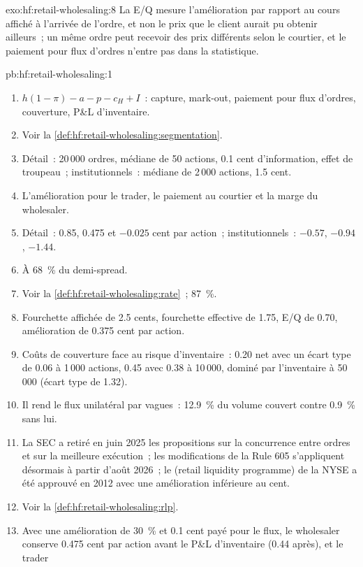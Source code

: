 \begin{solution}{exo:hf:retail-wholesaling:8}
La E/Q mesure l'amélioration par rapport au cours affiché à l'arrivée de l'ordre, et non le prix que le client aurait pu obtenir ailleurs~; un même ordre peut recevoir des
prix différents selon le courtier, et le paiement pour flux d'ordres n'entre pas dans la statistique.
\end{solution}

\begin{solution}{pb:hf:retail-wholesaling:1}
\begin{enumerate}
\item $h(1-\pi)-a-p-c_H+I$~: capture, mark-out, paiement pour flux d'ordres, couverture, P\&L d'inventaire.
\item Voir la \cref{def:hf:retail-wholesaling:segmentation}.
\item Détail~: 20\,000 ordres, médiane de 50 actions, 0.1 cent d'information, effet de troupeau~; institutionnels~: médiane de 2\,000 actions, 1.5 cent.
\item L'amélioration pour le trader, le paiement au courtier et la marge du wholesaler.
\item Détail~: 0.85, 0.475 et $-0.025$ cent par action~; institutionnels~: $-0.57$, $-0.94$, $-1.44$.
\item À 68~\% du demi-spread.
\item Voir la \cref{def:hf:retail-wholesaling:rate}~; 87~\%.
\item Fourchette affichée de 2.5 cents, fourchette effective de 1.75, E/Q de 0.70, amélioration de 0.375 cent par action.
\item Coûts de couverture face au risque d'inventaire~: 0.20 net avec un écart type de 0.06 à 1\,000 actions, 0.45 avec 0.38 à 10\,000, dominé par l'inventaire à 50\,000
(écart type de 1.32).
\item Il rend le flux unilatéral par vagues~: 12.9~\% du volume couvert contre 0.9~\% sans lui.
\item La SEC a retiré en juin 2025 les propositions sur la concurrence entre ordres et sur la meilleure exécution~; les modifications de la Rule 605 s'appliquent désormais à partir d'août 2026~; le
 (retail liquidity programme) de la NYSE a été approuvé en 2012 avec une amélioration inférieure au cent.
\item Voir la \cref{def:hf:retail-wholesaling:rlp}.
\item Avec une amélioration de 30~\% et 0.1 cent payé pour le flux, le wholesaler conserve 0.475 cent par action avant le P\&L d'inventaire (0.44 après), et le trader

\end{enumerate}
\end{solution}
